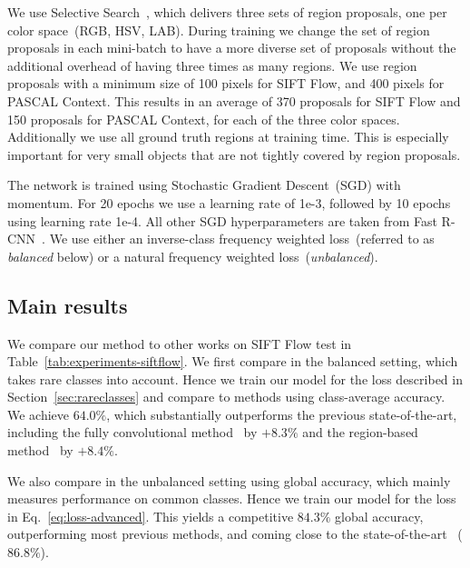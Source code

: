 We use Selective Search~\cite{uijlings13ijcv}, which delivers three sets of region proposals, one per color space~(RGB, HSV, LAB).
During training we change the set of region proposals in each mini-batch to have a more diverse set of proposals without the additional overhead of having three times as many regions.
We use region proposals with a minimum size of 100 pixels for SIFT Flow, and 400 pixels for PASCAL Context.
This results in an average of 370 proposals for SIFT Flow and 150 proposals for PASCAL Context, for each of the three color spaces.
Additionally we use all ground truth regions at training time.
This is especially important for very small objects that are not tightly covered by region proposals.

The network is trained using Stochastic Gradient Descent~(SGD) with momentum.
For 20 epochs we use a learning rate of 1e-3, followed by 10 epochs using learning rate 1e-4.
All other SGD hyperparameters are taken from Fast R-CNN~\cite{girshick15iccv}.
We use either an inverse-class frequency weighted loss~(referred to as {\em balanced} below) or a natural frequency weighted
loss~({\em unbalanced}).

\subsection{Main results}

We compare our method to other works on SIFT Flow test in Table~\ref{tab:experiments-siftflow}.
We first compare in the balanced setting, which takes rare classes into
account.
Hence we train our model for the loss described in Section~\ref{sec:rareclasses} and compare to methods using class-average accuracy.
We achieve $64.0\%$, which substantially outperforms the previous state-of-the-art, including the fully convolutional method~\cite{eigen15iccv} by $+8.3\%$ and the region-based method~\cite{caesar15bmvc} by $+8.4\%$.

We also compare in the unbalanced setting using global accuracy, which mainly measures performance on common classes.
Hence we train our model for the loss in Eq.~\eqref{eq:loss-advanced}.
This yields a competitive $84.3\%$ global accuracy, outperforming most previous methods, and coming close to the state-of-the-art~\cite{eigen15iccv} ($86.8\%$).

